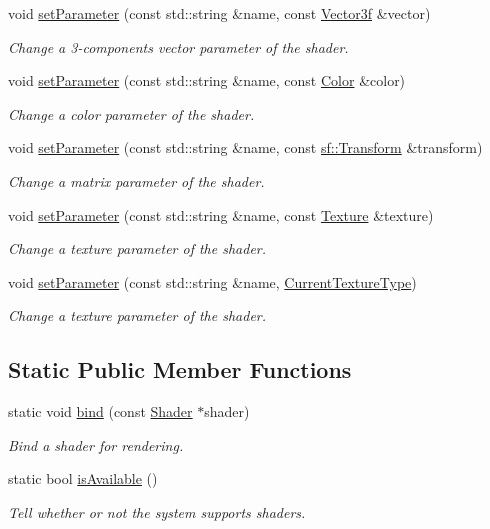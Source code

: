 \begin{DoxyCompactItemize}
void \hyperlink{classsf_1_1_shader_a87d4a0c6dc70ae68aecc0dda3f343c07}{set\+Parameter} (const std\+::string \&name, const \hyperlink{classsf_1_1_vector3}{Vector3f} \&vector)
\begin{DoxyCompactList}\small\item\em Change a 3-\/components vector parameter of the shader. \end{DoxyCompactList}\item 
void \hyperlink{classsf_1_1_shader_aa8618119ed4399df3fd33e78ee96b4fc}{set\+Parameter} (const std\+::string \&name, const \hyperlink{classsf_1_1_color}{Color} \&color)
\begin{DoxyCompactList}\small\item\em Change a color parameter of the shader. \end{DoxyCompactList}\item 
void \hyperlink{classsf_1_1_shader_a39c387cc30e249b22a0c478703b8cc9a}{set\+Parameter} (const std\+::string \&name, const \hyperlink{classsf_1_1_transform}{sf\+::\+Transform} \&transform)
\begin{DoxyCompactList}\small\item\em Change a matrix parameter of the shader. \end{DoxyCompactList}\item 
void \hyperlink{classsf_1_1_shader_a7f58ab5c0a1084f238dfcec86602daa1}{set\+Parameter} (const std\+::string \&name, const \hyperlink{classsf_1_1_texture}{Texture} \&texture)
\begin{DoxyCompactList}\small\item\em Change a texture parameter of the shader. \end{DoxyCompactList}\item 
void \hyperlink{classsf_1_1_shader_af06b4cba0bab915fa01032b063909044}{set\+Parameter} (const std\+::string \&name, \hyperlink{structsf_1_1_shader_1_1_current_texture_type}{Current\+Texture\+Type})
\begin{DoxyCompactList}\small\item\em Change a texture parameter of the shader. \end{DoxyCompactList}\end{DoxyCompactItemize}
\subsection*{Static Public Member Functions}
\begin{DoxyCompactItemize}
\item 
static void \hyperlink{classsf_1_1_shader_a09778f78afcbeb854d608c8dacd8ea30}{bind} (const \hyperlink{classsf_1_1_shader}{Shader} $\ast$shader)
\begin{DoxyCompactList}\small\item\em Bind a shader for rendering. \end{DoxyCompactList}\item 
static bool \hyperlink{classsf_1_1_shader_ad22474690bafe4a305c1b9826b1bd86a}{is\+Available} ()
\begin{DoxyCompactList}\small\item\em Tell whether or not the system supports shaders. \end{DoxyCompactList}\end{DoxyCompactItemize}
